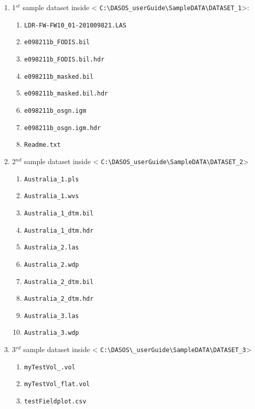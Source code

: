 \documentclass{article}
\begin{document}
	   	\begin{enumerate}
	   		\item 1$^{st}$ sample dataset inside < \verb|C:\DASOS_userGuide\SampleDATA\DATASET_1|>: 
	   		\begin{enumerate}
	   			\item \verb|LDR-FW-FW10_01-201009821.LAS|
	   			\item \verb|e098211b_FODIS.bil|
	   			\item \verb|e098211b_FODIS.bil.hdr|
	   			\item \verb|e098211b_masked.bil|
	   			\item \verb|e098211b_masked.bil.hdr|
	   			\item \verb|e098211b_osgn.igm|
	   			\item \verb|e098211b_osgn.igm.hdr|
	   			\item \verb|Readme.txt|
	   		\end{enumerate}
	   		\item 2$^{nd}$ sample dataset inside < \verb|C:\DASOS_userGuide\SampleDATA\DATASET_2|>
	   		\begin{enumerate}
	   			\item \verb|Australia_1.pls|
	   			\item \verb|Australia_1.wvs|
	   			\item \verb|Australia_1_dtm.bil|
	   			\item \verb|Australia_1_dtm.hdr|
	   			\item \verb|Australia_2.las|
	   			\item \verb|Australia_2.wdp|
	   			\item \verb|Australia_2_dtm.bil|
	   			\item \verb|Australia_2_dtm.hdr|
	   			\item \verb|Australia_3.las|
	   			\item \verb|Australia_3.wdp|
	   		\end{enumerate}
	   		
	   		\item 3$^{rd}$ sample dataset inside < \verb|C:\DASOS\_userGuide\SampleDATA\DATASET_3|>
	   		\begin{enumerate}
	   			\item \verb|myTestVol_.vol|
	   			\item \verb|myTestVol_flat.vol|
	   			\item \verb|testFieldplot.csv|
	   		\end{enumerate}
	   		
	   	\end{enumerate}
	   	
\end{document}
